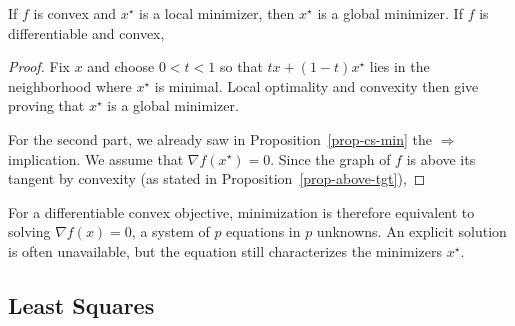 \begin{prop} 
If $f$ is convex and $x^\star$ is a local minimizer, then $x^\star$ is a global minimizer.
If $f$ is differentiable and convex, 
\end{prop}
\begin{proof}
Fix $x$ and choose $0<t<1$ so that $tx+(1-t)x^\star$ lies in the neighborhood where $x^\star$ is minimal. Local optimality and convexity then give
proving that $x^\star$ is a global minimizer.

For the second part, we already saw in Proposition~\ref{prop-cs-min} the $\Rightarrow$ implication. We assume that $\nabla f(x^\star)=0$. Since the graph of $f$ is above its tangent by convexity (as stated in Proposition~\ref{prop-above-tgt}),
\end{proof}

For a differentiable convex objective, minimization is therefore equivalent to solving $\nabla f(x)=0$, a system of $p$ equations in $p$ unknowns.
%
An explicit solution is often unavailable, but the equation still characterizes the minimizers $x^\star$.



\subsection{Least Squares}

